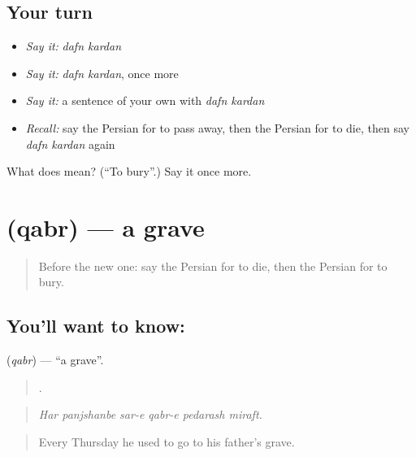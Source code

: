 \subsection*{Your turn}
\begin{itemize}
\raggedright
  \item \emph{Say it:} \emph{dafn kardan}
  \item \emph{Say it:} \emph{dafn kardan}, once more
  \item \emph{Say it:} a sentence of your own with \emph{dafn kardan}
  \item \emph{Recall:} say the Persian for to pass away, then the Persian for to die, then say \emph{dafn kardan} again
\end{itemize}

\begin{tcolorbox}[breakable,colback=teal!4,colframe=teal!35!black,title={Before you move on}]
What does   mean? (\textquotedblleft{}To bury\textquotedblright{}.) Say it once more.
\end{tcolorbox}
\section[\texorpdfstring{\fa{قبر} (qabr)}{قبر (qabr)}]{ (qabr) — a grave}

\label{lesson:FA-C337-qabr}



\begin{quote}
Before the new one: say the Persian for to die, then the Persian for to bury.
\end{quote}

\subsection*{You'll want to know: }
\textbf{} (\emph{qabr}) — \textquotedblleft{}a grave\textquotedblright{}.

\begin{quote}
     .
\end{quote}

\begin{quote}
\emph{Har panjshanbe sar-e qabr-e pedarash miraft.}
\end{quote}

\begin{quote}
Every Thursday he used to go to his father's grave.
\end{quote}

